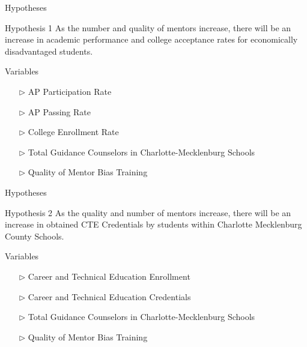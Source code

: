\documentclass[10pt]{beamer}
\begin{document}
\begin{frame}[fragile]{Hypotheses}
    \fontsize{11pt}{7.2}
    \begin{block}{Hypothesis 1}
        As the number and quality of mentors increase, there will be an increase in academic performance and college acceptance rates for economically disadvantaged students.
    \end{block}

    \pause

    \vspace{.6cm}

    \begin{exampleblock}{Variables}
        \begin{itemize}
            \item[$\triangleright$] AP Participation Rate
            \item[$\triangleright$] AP Passing Rate
            \item[$\triangleright$] College Enrollment Rate 
            \item[$\triangleright$] Total Guidance Counselors in Charlotte-Mecklenburg Schools
            \item[$\triangleright$] Quality of Mentor Bias Training
        \end{itemize}
    \end{exampleblock}

\end{frame}

\begin{frame}[fragile]{Hypotheses}
    \fontsize{11pt}{7.2}
    \begin{block}{Hypothesis 2}
        As the quality and number of mentors increase, there will be an increase in obtained CTE  Credentials by students within Charlotte Mecklenburg County Schools.
    \end{block}

    \pause 

    \vspace{1cm}

    \begin{exampleblock}{Variables}
        \begin{itemize}
            \item[$\triangleright$] Career and Technical Education Enrollment
            \item[$\triangleright$] Career and Technical Education Credentials
            \item[$\triangleright$] Total Guidance Counselors in Charlotte-Mecklenburg Schools
            \item[$\triangleright$] Quality of Mentor Bias Training
        \end{itemize}
    \end{exampleblock}

\end{frame}
\end{document}
